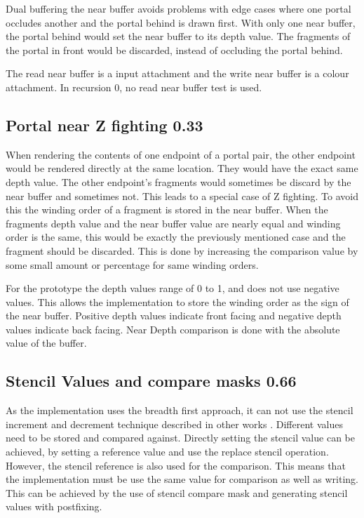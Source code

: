 Dual buffering the near buffer avoids problems with edge cases where one portal occludes another and the portal behind is drawn first. With only one near buffer, the portal behind would set the near buffer to its depth value. The fragments of the portal in front would be discarded, instead of occluding the portal behind.

The read near buffer is a input attachment and the write near buffer is a colour attachment. In recursion 0, no read near buffer test is used.

\subsection{Portal near Z fighting 0.33}
\label{section:portalzfighting}
When rendering the contents of one endpoint of a portal pair, the other endpoint would be rendered directly at the same location. They would have the exact same depth value. The other endpoint's fragments would sometimes be discard by the near buffer and sometimes not. This leads to a special case of Z fighting. To avoid this the winding order of a fragment is stored in the near buffer. When the fragments depth value and the near buffer value are nearly equal and winding order is the same, this would be exactly the previously mentioned case and the fragment should be discarded. This is done by increasing the comparison value by some small amount or percentage for same winding orders.

For the prototype the depth values range of 0 to 1, and does not use negative values. This allows the implementation to store the winding order as the sign of the near buffer. Positive depth values indicate front facing and negative depth values indicate back facing. Near Depth comparison is done with the absolute value of the buffer.

\subsection{Stencil Values and compare masks 0.66}
\label{section:stencilcomparemasks}

As the implementation uses the breadth first approach, it can not use the stencil increment and decrement technique described in other works \cite{schmalstieg:1999:sewing, lowe:2003:fragment, lecture:portalProblems}. Different values need to be stored and compared against. Directly setting the stencil value can be achieved, by setting a reference value and use the replace stencil operation. However, the stencil reference is also used for the comparison. This means that the implementation must be use the same value for comparison as well as writing. This can be achieved by the use of stencil compare mask and generating stencil values with postfixing.

